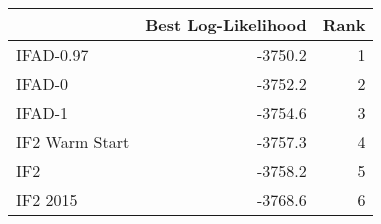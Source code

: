 \begin{tabular}{lrr}
\toprule
 & Best Log-Likelihood & Rank \\
\midrule
IFAD-0.97 & -3750.2 & 1 \\
IFAD-0 & -3752.2 & 2 \\
IFAD-1 & -3754.6 & 3 \\
IF2 Warm Start & -3757.3 & 4 \\
IF2 & -3758.2 & 5 \\
IF2 2015 & -3768.6 & 6 \\
\bottomrule
\end{tabular}
